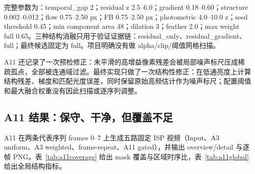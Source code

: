 \documentclass[11pt,a4paper,UTF8,fontset=fandol]{ctexart}
\begin{document}
完整参数为：temporal\_gap 2；residual z 2.5--6.0；gradient 0.18--0.60；structure 0.002--0.012；flow 0.75--2.50 px；FB 0.75--2.50 px；photometric 4.0--10.0 z；seed threshold 0.45；min component area 48；dilation 3；feather 2.0；max weight full 0.65。三种结构消融只用于验证证据链：residual\_only、residual\_gradient、full；最终候选固定为 full。项目明确没有做 alpha/clip/阈值网格扫描。

A11 还记录了一次预检修正：未平滑的高增益像素残差会被局部噪声标尺压成稀疏孤点，全部被连通域过滤。最终实现只做了一次结构性修正：在低通亮度上计算结构残差、梯度和匹配光度误差，同时保留原始高频估计作为噪声标尺；配置阈值和最大融合权重没有因此扫描或逐序列调整。

\subsection{A11 结果：保守、干净，但覆盖不足}

A11 在两条代表序列 frames 0--7 上生成五路固定 ISP 视频（Input、A3 uniform、A3 weighted、frame-repeat、A11 gated），并输出 overview/detail 与逐帧 PNG。表~\ref{tab:a11coverage} 给出 mask 覆盖与区域时序比，表~\ref{tab:a11global} 给出全局结构指标。

\begin{table}[H]
\centering
\small
\caption{A11 mask 覆盖与区域时序比。}
\label{tab:a11coverage}
\end{table}
\end{document}
